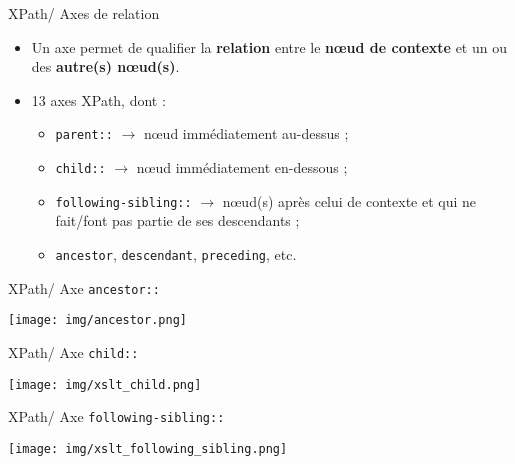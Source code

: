 \documentclass{beamer}
\begin{document}
        \begin{frame}{XPath/ Axes de relation}
        \Large
        \begin{itemize}
            \item Un axe permet de qualifier la \textbf{relation} entre le \textbf{n\oe ud de contexte} et un ou des \textbf{autre(s) n\oe ud(s)}.

            \bigskip

            \item 13 axes XPath, dont :
            \begin{itemize}
            \large
                \item \texttt{parent::} $\rightarrow$ n\oe ud immédiatement au-dessus ;
                \item \texttt{child::} $\rightarrow$ n\oe ud immédiatement en-dessous ;
                \item \texttt{following-sibling::} $\rightarrow$ n\oe ud(s) après celui de contexte et qui ne fait/font pas partie de ses descendants ;
                \item \texttt{ancestor}, \texttt{descendant}, \texttt{preceding}, etc.
            \end{itemize}
        \end{itemize}
        
    \end{frame}

    \begin{frame}{XPath/ Axe \texttt{ancestor::}}
        \begin{center}
            \texttt{[image: img/ancestor.png]}
        \end{center}
    \end{frame}

    \begin{frame}{XPath/ Axe \texttt{child::}}
        \begin{center}
            \texttt{[image: img/xslt\_child.png]}
        \end{center}
    \end{frame}

    \begin{frame}{XPath/ Axe \texttt{following-sibling::}}
        \begin{center}
            \texttt{[image: img/xslt\_following\_sibling.png]}
        \end{center}
    \end{frame}
\end{document}
